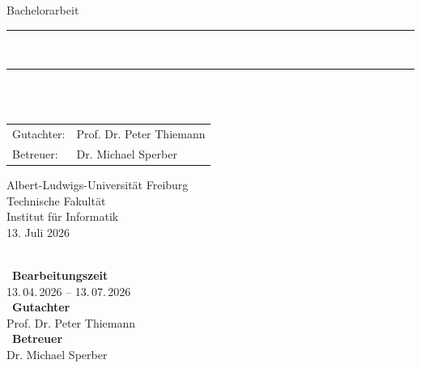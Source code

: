 \begin{titlepage}
\begin{center}

\newcommand{\HorizontalLine}{\rule{\linewidth}{0.3mm}}

{\Large Bachelorarbeit}\\[1.3cm]


\HorizontalLine \\[0.4cm]
{ \huge \bfseries \thetitle }
\HorizontalLine \\[1.5cm]

{\Huge \theauthor} \\[2cm]


\begin{tabular}[hc]{>{\huge}l >{\huge}l}
  Gutachter: & Prof. Dr. Peter Thiemann \\[0.3cm]
  Betreuer: & Dr. Michael Sperber \\[1.2cm]
\end{tabular}
\vfill  %

\Large {
    Albert-Ludwigs-Universität Freiburg\\
    Technische Fakultät\\
    Institut für Informatik\\
    13. Juli 2026
    \\
}
\end{center}
\end{titlepage}

\thispagestyle{empty}
\ \vfill \ \\  %
\
\textbf{Bearbeitungszeit}            \smallskip{} \\
13.\,04.\,2026 -- 13.\,07.\,2026   \bigskip{} \\
\
\textbf{Gutachter}                  \smallskip{} \\
Prof. Dr. Peter Thiemann               \bigskip{} \\
\
\textbf{Betreuer}                  \smallskip{} \\
Dr. Michael Sperber
